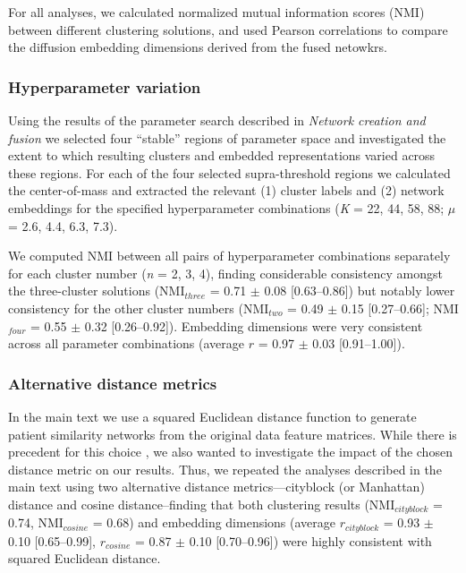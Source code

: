 \documentclass[12pt,aps,pra,reprint,showkeys]{revtex4-1}
\begin{document}
For all analyses, we calculated normalized mutual information scores (NMI) between different clustering solutions, and used Pearson correlations to compare the diffusion embedding dimensions derived from the fused netowkrs.

\subsubsection*{Hyperparameter variation}

Using the results of the parameter search described in \textit{Network creation and fusion} we selected four ``stable'' regions of parameter space and investigated the extent to which resulting clusters and embedded representations varied across these regions.
For each of the four selected supra-threshold regions we calculated the center-of-mass and extracted the relevant (1) cluster labels and (2) network embeddings for the specified hyperparameter combinations (\emph{K} = 22, 44, 58, 88; $\mu$ = 2.6, 4.4, 6.3, 7.3).

We computed NMI between all pairs of hyperparameter combinations separately for each cluster number (\emph{n} = 2, 3, 4), finding considerable consistency amongst the three-cluster solutions (NMI$_{three}$ = 0.71 $\pm$ 0.08 [0.63--0.86]) but notably lower consistency for the other cluster numbers (NMI$_{two}$ = 0.49 $\pm$ 0.15 [0.27--0.66]; NMI$_{four}$ = 0.55 $\pm$ 0.32 [0.26--0.92]).
Embedding dimensions were very consistent across all parameter combinations (average $r$ = 0.97 $\pm$ 0.03 [0.91--1.00]).

\subsubsection*{Alternative distance metrics}

In the main text we use a squared Euclidean distance function to generate patient similarity networks from the original data feature matrices.
While there is precedent for this choice \citep{wang2014similarity, stefanik2018brain, jacobs2020integration}, we also wanted to investigate the impact of the chosen distance metric on our results.
Thus, we repeated the analyses described in the main text using two alternative distance metrics---cityblock (or Manhattan) distance and cosine distance--finding that both clustering results (NMI$_{cityblock}$ = 0.74, NMI$_{cosine}$ = 0.68) and embedding dimensions (average $r_{cityblock}$ = 0.93 $\pm$ 0.10 [0.65--0.99], $r_{cosine}$ = 0.87 $\pm$ 0.10 [0.70--0.96]) were highly consistent with squared Euclidean distance.
\end{document}
